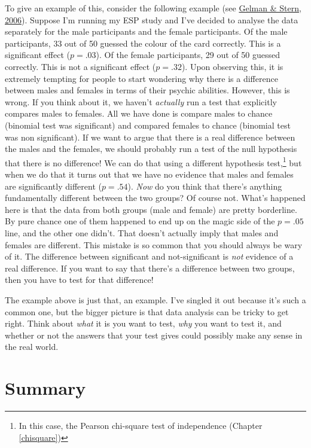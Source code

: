 \documentclass[
]{book}
\begin{document}
To give an example of this, consider the following example (see \protect\hyperlink{ref-Gelman2006}{Gelman \& Stern, 2006}). Suppose I'm running my ESP study and I've decided to analyse the data separately for the male participants and the female participants. Of the male participants, 33 out of 50 guessed the colour of the card correctly. This is a significant effect (\(p = .03\)). Of the female participants, 29 out of 50 guessed correctly. This is not a significant effect (\(p = .32\)). Upon observing this, it is extremely tempting for people to start wondering why there is a difference between males and females in terms of their psychic abilities. However, this is wrong. If you think about it, we haven't \emph{actually} run a test that explicitly compares males to females. All we have done is compare males to chance (binomial test was significant) and compared females to chance (binomial test was non significant). If we want to argue that there is a real difference between the males and the females, we should probably run a test of the null hypothesis that there is no difference! We can do that using a different hypothesis test,\footnote{In this case, the Pearson chi-square test of independence (Chapter \ref{chisquare})} but when we do that it turns out that we have no evidence that males and females are significantly different (\(p = .54\)). \emph{Now} do you think that there's anything fundamentally different between the two groups? Of course not. What's happened here is that the data from both groups (male and female) are pretty borderline. By pure chance one of them happened to end up on the magic side of the \(p = .05\) line, and the other one didn't. That doesn't actually imply that males and females are different. This mistake is so common that you should always be wary of it. The difference between significant and not-significant is \emph{not} evidence of a real difference. If you want to say that there's a difference between two groups, then you have to test for that difference!

The example above is just that, an example. I've singled it out because it's such a common one, but the bigger picture is that data analysis can be tricky to get right. Think about \emph{what} it is you want to test, \emph{why} you want to test it, and whether or not the answers that your test gives could possibly make any sense in the real world.

\hypertarget{summary-4}{%
\section{Summary}\label{summary-4}}
\end{document}
